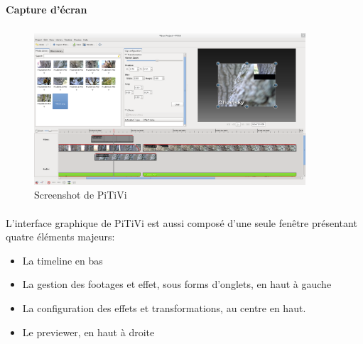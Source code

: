 \paragraph {Capture d'écran}

\subparagraph{}

\begin{figure}[H]

  \begin{center}

    \includegraphics[width=0.90\textwidth]{images/pitivi}

  \end{center}

  \caption{Screenshot de PiTiVi}

  \label{Yes}

\end{figure}

\paragraph{}

L'interface graphique de PiTiVi est aussi composé d'une seule fenêtre
présentant quatre éléments majeurs:

\begin{itemize}

  \item {La timeline en bas}

  \item {La gestion des footages et effet, sous forms d'onglets, en haut
  à gauche}

  \item {La configuration des effets et transformations, au centre
  en haut.}

  \item {Le previewer, en haut à droite}

\end{itemize}

